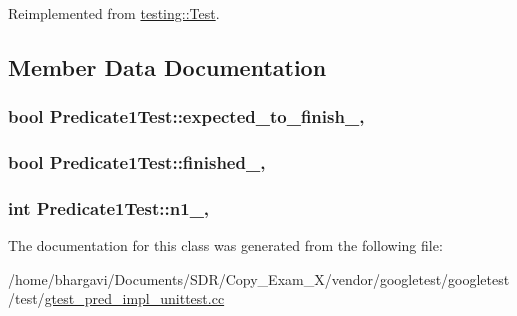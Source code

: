Reimplemented from \hyperlink{classtesting_1_1_test_a5f0ab439802cbe0ef7552f1a9f791923}{testing\+::\+Test}.



\subsection{Member Data Documentation}
\subsubsection[{\texorpdfstring{expected\+\_\+to\+\_\+finish\+\_\+}{expected_to_finish_}}]{\setlength{\rightskip}{0pt plus 5cm}bool Predicate1\+Test\+::expected\+\_\+to\+\_\+finish\+\_\+\hspace{0.3cm}{\ttfamily [static]}, {\ttfamily [protected]}}\hypertarget{class_predicate1_test_ad91cfa58e6352d53abacce32df2ef635}{}\label{class_predicate1_test_ad91cfa58e6352d53abacce32df2ef635}
\subsubsection[{\texorpdfstring{finished\+\_\+}{finished_}}]{\setlength{\rightskip}{0pt plus 5cm}bool Predicate1\+Test\+::finished\+\_\+\hspace{0.3cm}{\ttfamily [static]}, {\ttfamily [protected]}}\hypertarget{class_predicate1_test_a6d45fb2d1f01a5c8baf28f60039c244e}{}\label{class_predicate1_test_a6d45fb2d1f01a5c8baf28f60039c244e}
\subsubsection[{\texorpdfstring{n1\+\_\+}{n1_}}]{\setlength{\rightskip}{0pt plus 5cm}int Predicate1\+Test\+::n1\+\_\+\hspace{0.3cm}{\ttfamily [static]}, {\ttfamily [protected]}}\hypertarget{class_predicate1_test_a528d9f7f618b17802962a3824eea11e3}{}\label{class_predicate1_test_a528d9f7f618b17802962a3824eea11e3}


The documentation for this class was generated from the following file\+:\begin{DoxyCompactItemize}
\item 
/home/bhargavi/\+Documents/\+S\+D\+R/\+Copy\+\_\+\+Exam\+\_\+X/vendor/googletest/googletest/test/\hyperlink{gtest__pred__impl__unittest_8cc}{gtest\+\_\+pred\+\_\+impl\+\_\+unittest.\+cc}\end{DoxyCompactItemize}
